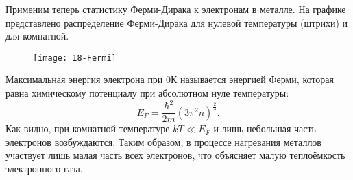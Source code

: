 Применим теперь статистику Ферми-Дирака к электронам в металле. На графике
представлено распределение Ферми-Дирака для нулевой температуры (штрихи) и для
комнатной.

\begin{figure}[h!]
    \center
    \texttt{[image: 18-Fermi]}
\end{figure}

Максимальная энергия электрона при 0К называется энергией Ферми, которая равна
химическому потенциалу при абсолютном нуле температуры:
\[
    E_F = \frac{\hbar^2}{2m}(3\pi^2n)^\frac{2}{3}.
\]
Как видно, при комнатной температуре \( kT \ll E_F \) и лишь небольшая часть
электронов возбуждаются. Таким образом, в процессе нагревания металлов участвует
лишь малая часть всех электронов, что объясняет малую теплоёмкость электронного
газа.
\newpage
